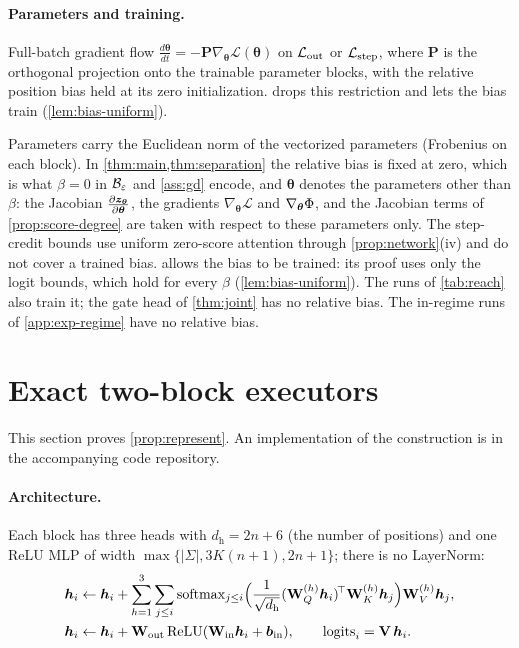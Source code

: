 \paragraph{Parameters and training.}

\begin{assumption}[Training]
\label{ass:gd}
Full-batch gradient flow $\tfrac{d\bm\theta}{dt}=-\mathbf P\nabla_{\bm\theta}\mathcal L(\bm\theta)$ on $\mathcal L_{\mathrm{out}}$ or $\mathcal L_{\mathrm{step}}$, where $\mathbf P$ is the orthogonal projection onto
the trainable parameter blocks, with the relative
position bias held at its zero initialization.  drops this restriction and lets the bias train (\cref{lem:bias-uniform}).
\end{assumption}

\label{rem:norms}Parameters carry the Euclidean norm of the vectorized parameters (Frobenius on
each block). In \cref{thm:main,thm:separation} the relative bias is fixed at zero, which is what $\beta=0$ in $\mathcal B_{\varepsilon}$ and
\cref{ass:gd} encode, and $\bm\theta$ denotes the parameters other than $\beta$: the Jacobian $\Jz$, the gradients $\nabla_{\bm\theta}\mathcal L$ and
$\nabla_{\bm\theta}\Phi$, and the Jacobian terms of \cref{prop:score-degree} are taken with respect to these parameters only. The step-credit bounds use uniform
zero-score attention through \cref{prop:network}(iv) and do not cover a trained bias.  allows the bias to be
trained: its proof uses only the logit bounds, which hold for every $\beta$ (\cref{lem:bias-uniform}). The runs of \cref{tab:reach} also train it; the gate head of \cref{thm:joint} has no relative bias. The in-regime runs of \cref{app:exp-regime} have no relative bias.


\section{Exact two-block executors}
\label{app:architectures}

This section proves \cref{prop:represent}. An implementation of the construction is in the accompanying code repository.

\paragraph{Architecture.}
\label{app:construction}
\label{app:model}
Each block has three heads with $d_{\mathrm h}=2n+6$ (the number of positions) and one ReLU MLP of width $\max\{|\Sigma|,3K(n+1),2n+1\}$;
there is no LayerNorm:
\begin{align*}
 \bm h_i&\leftarrow \bm h_i+\sum_{h=1}^{3}\sum_{j\le i}\operatorname{softmax}_{j\le i}\Bigl(\tfrac{1}{\sqrt{d_{\mathrm h}}}(\mathbf W^{(h)}_Q\bm h_i)^{\!\top}\mathbf W^{(h)}_K\bm h_j\Bigr)\mathbf W^{(h)}_V\bm h_j,\\
 \bm h_i&\leftarrow \bm h_i+\mathbf W_{\mathrm{out}}\relu(\mathbf W_{\mathrm{in}}\bm h_i+\bm b_{\mathrm{in}}),\qquad \mathrm{logits}_i=\mathbf V\,\bm h_i .
\end{align*}

